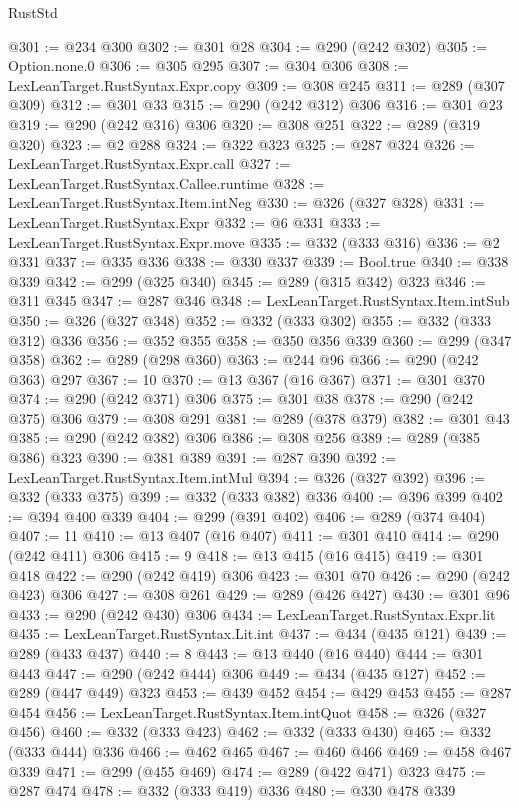 \begin{lexlean}{RustStd}
\begin{coremodule}
@301 := @234 @300
@302 := @301 @28
@304 := @290 (@242 @302)
@305 := Option.none.{0}
@306 := @305 @295
@307 := @304 @306
@308 := LexLeanTarget.RustSyntax.Expr.copy
@309 := @308 @245
@311 := @289 (@307 @309)
@312 := @301 @33
@315 := @290 (@242 @312) @306
@316 := @301 @23
@319 := @290 (@242 @316) @306
@320 := @308 @251
@322 := @289 (@319 @320)
@323 := @2 @288
@324 := @322 @323
@325 := @287 @324
@326 := LexLeanTarget.RustSyntax.Expr.call
@327 := LexLeanTarget.RustSyntax.Callee.runtime
@328 := LexLeanTarget.RustSyntax.Item.intNeg
@330 := @326 (@327 @328)
@331 := LexLeanTarget.RustSyntax.Expr
@332 := @6 @331
@333 := LexLeanTarget.RustSyntax.Expr.move
@335 := @332 (@333 @316)
@336 := @2 @331
@337 := @335 @336
@338 := @330 @337
@339 := Bool.true
@340 := @338 @339
@342 := @299 (@325 @340)
@345 := @289 (@315 @342) @323
@346 := @311 @345
@347 := @287 @346
@348 := LexLeanTarget.RustSyntax.Item.intSub
@350 := @326 (@327 @348)
@352 := @332 (@333 @302)
@355 := @332 (@333 @312) @336
@356 := @352 @355
@358 := @350 @356 @339
@360 := @299 (@347 @358)
@362 := @289 (@298 @360)
@363 := @244 @96
@366 := @290 (@242 @363) @297
@367 := 10
@370 := @13 @367 (@16 @367)
@371 := @301 @370
@374 := @290 (@242 @371) @306
@375 := @301 @38
@378 := @290 (@242 @375) @306
@379 := @308 @291
@381 := @289 (@378 @379)
@382 := @301 @43
@385 := @290 (@242 @382) @306
@386 := @308 @256
@389 := @289 (@385 @386) @323
@390 := @381 @389
@391 := @287 @390
@392 := LexLeanTarget.RustSyntax.Item.intMul
@394 := @326 (@327 @392)
@396 := @332 (@333 @375)
@399 := @332 (@333 @382) @336
@400 := @396 @399
@402 := @394 @400 @339
@404 := @299 (@391 @402)
@406 := @289 (@374 @404)
@407 := 11
@410 := @13 @407 (@16 @407)
@411 := @301 @410
@414 := @290 (@242 @411) @306
@415 := 9
@418 := @13 @415 (@16 @415)
@419 := @301 @418
@422 := @290 (@242 @419) @306
@423 := @301 @70
@426 := @290 (@242 @423) @306
@427 := @308 @261
@429 := @289 (@426 @427)
@430 := @301 @96
@433 := @290 (@242 @430) @306
@434 := LexLeanTarget.RustSyntax.Expr.lit
@435 := LexLeanTarget.RustSyntax.Lit.int
@437 := @434 (@435 @121)
@439 := @289 (@433 @437)
@440 := 8
@443 := @13 @440 (@16 @440)
@444 := @301 @443
@447 := @290 (@242 @444) @306
@449 := @434 (@435 @127)
@452 := @289 (@447 @449) @323
@453 := @439 @452
@454 := @429 @453
@455 := @287 @454
@456 := LexLeanTarget.RustSyntax.Item.intQuot
@458 := @326 (@327 @456)
@460 := @332 (@333 @423)
@462 := @332 (@333 @430)
@465 := @332 (@333 @444) @336
@466 := @462 @465
@467 := @460 @466
@469 := @458 @467 @339
@471 := @299 (@455 @469)
@474 := @289 (@422 @471) @323
@475 := @287 @474
@478 := @332 (@333 @419) @336
@480 := @330 @478 @339

\end{coremodule}
\end{lexlean}

